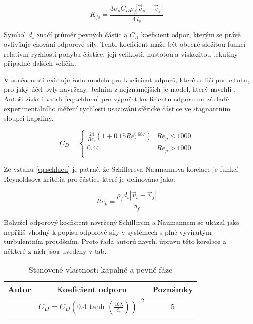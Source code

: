 \begin{equation}
	K_{fs}= \frac{3\alpha_{s}C_{D}\rho_{f}|\vec{v}_{s} - \vec{v}_{f}|}{4d_{s}}
	\label{eq:kfs}
\end{equation}
  
\noindent Symbol $d_{s}$ značí průměr pevných částic a $C_{D}$ koeficient odpor, kterým se právě ovlivňuje chování odporové síly. Tento koeficient může být obecně složitou funkcí relativní rychlosti pohybu částice, její velikosti, hustotou a viskozitou tekutiny případně dalších veličin.   

V současnosti existuje řada modelů pro koeficient odporů, které se liší podle toho, pro jaký účel byly navrženy. Jedním z nejznámějších je model, který navrhli \citet{schi32}. Autoři získali vztah \ref{eq:schlneu} pro výpočet koeficientu odporu na základě experimentálního měření rychlosti usazování sférické částice ve stagnantním sloupci kapaliny.    
 
\begin{equation}
	\label{eq:schlneu}
  C_{D} = \left\{ \begin{array}{ll}
  \frac{24}{Re_{p}}(1 + \num{0.15}Re_{p}^{\num{0.687}}) & Re_{p} \le 1000\\
  \num{0.44} & Re_{p} > 1000\\
  \end{array} \right.
\end{equation}

\noindent Ze vztahu \ref{eq:schlneu} je patrné, že Schillerova-Naumannova korelace je funkcí Reynoldsova kritéria pro částici, které je definováno jako:

\begin{equation}
	Re_{p}= \frac{\rho_{f}d_{s}|\vec{v}_{s} - \vec{v}_{f}|}{\eta_{f}}
	\label{eq:reyp}
\end{equation}

Bohužel odporový koeficient navržený Schillerem a Naumannem se ukázal jako nepříliš vhodný k popisu odporové síly v systémech s plně vyvinutým turbulentním prouděním. Proto řada autorů navrhl úpravu této korelace a některé z nich jsou uvedeny v tab.

\begin{table}[h!]
\begin{center}
  

		\caption{Stanovené vlastnosti kapalné a pevné fáze}
		\label{tab:cds}
\begin{tabular}{|c|c|c|}
  \hline
  
{\textbf{Autor}} & {\textbf{Koeficient odporu}} & {\textbf{Poznámky}} \\ \hline
\citet{mag90} & $C_{D} = C_{D}(\num{0.4}\tanh(\frac{16\lambda}{d_{s}}))^{-2}$ & 5 \\ \hline{}
  
\end{tabular}

\end{center}
\end{table}
